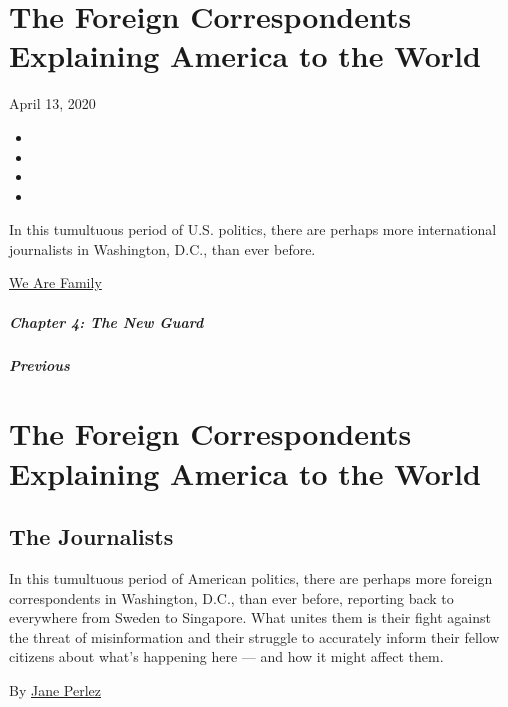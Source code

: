 \hypertarget{the-foreign-correspondents-explaining-america-to-the-world}{%
\section{The Foreign Correspondents Explaining America to the
World}\label{the-foreign-correspondents-explaining-america-to-the-world}}

April 13, 2020

\begin{itemize}
\item
\item
\item
\item
\end{itemize}

In this tumultuous period of U.S. politics, there are perhaps more
international journalists in Washington, D.C., than ever before.

\href{https://www.nytimes.com/interactive/2020/04/13/t-magazine/culture-issue-2020.html}{We
Are Family}

\hypertarget{chapter-4-the-new-guard}{%
\subparagraph{Chapter 4: The New Guard}\label{chapter-4-the-new-guard}}

\hypertarget{previous}{%
\subparagraph{Previous}\label{previous}}

\hypertarget{the-foreign-correspondents-explaining-america-to-the-world-1}{%
\section{The Foreign Correspondents Explaining America to the
World}\label{the-foreign-correspondents-explaining-america-to-the-world-1}}

\hypertarget{the-journalists}{%
\subsection{The Journalists}\label{the-journalists}}

In this tumultuous period of American politics, there are perhaps more
foreign correspondents in Washington, D.C., than ever before, reporting
back to everywhere from Sweden to Singapore. What unites them is their
fight against the threat of misinformation and their struggle to
accurately inform their fellow citizens about what's happening here ---
and how it might affect them.

By \href{https://www.nytimes.com/by/jane-perlez}{Jane Perlez}

